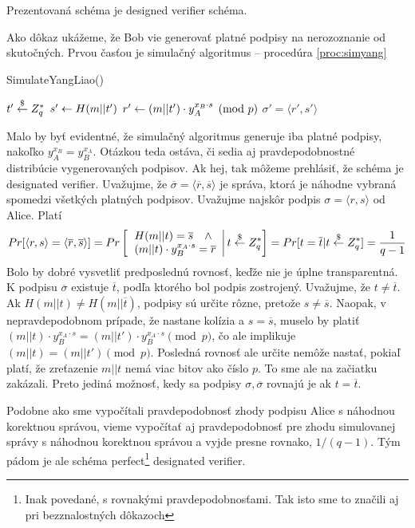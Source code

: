 \begin{lema}
    Prezentovaná schéma je designed verifier schéma.
\end{lema}
\begin{dokaz}
    Ako dôkaz ukážeme, že Bob vie generovať platné podpisy na
    nerozoznanie od skutočných. Prvou časťou je simulačný algoritmus
    -- procedúra \ref{proc:simyang}
    \begin{procedure}
        \caption{SimulateYangLiao()}
        \label{proc:simyang}
        $t' \overset{\$}{\leftarrow} Z_q^*$\;
        $s' \leftarrow H(m||t')$\;
        $r' \leftarrow (m||t') \cdot y_A^{x_B \cdot s} \pmod{p}$\; 
        \Return $\sigma'=\langle r',s' \rangle$\;
    \end{procedure}

    Malo by byť evidentné, že simulačný algoritmus generuje iba platné
    podpisy, nakoľko $y_A^{x_B} = y_B^{x_A}$.
    Otázkou teda ostáva, či sedia aj pravdepodobnostné
    distribúcie vygenerovaných podpisov. Ak hej, tak môžeme prehlásiť,
    že schéma je designated verifier.
    Uvažujme, že
    $\overline{\sigma}=\langle \overline{r}, \overline{s} \rangle$ 
    je správa, ktorá je
    náhodne vybraná spomedzi všetkých platných podpisov.
    Uvažujme najskôr podpis $\sigma = \langle r,s \rangle$ od Alice.
    Platí
    \begin{equation*}
        Pr[\langle r,s \rangle = 
            \langle \overline{r}, \overline{s} \rangle] =
        Pr\left[ \left.
            \begin{array}{l}
            H(m||t) = \overline{s} \quad \land \\ 
            (m||t) \cdot y_B^{x_A \cdot s} = \overline{r}
            \end{array} \right| t \overset{\$}{\leftarrow} Z_q^*
        \right] = Pr[t = \overline{t} | t \overset{\$}{\leftarrow} Z_q^*] = \frac{1}{q-1}
    \end{equation*}
    Bolo by dobré vysvetliť predposlednú rovnosť, keďže nie je úplne
    transparentná. K podpisu $\overline{\sigma}$ existuje
    $\overline{t}$, podľa ktorého bol podpis zostrojený.
    Uvažujme, že $t \ne \overline{t}$. 
    Ak $H(m||t) \ne H(m||\overline{t})$, podpisy sú určite rôzne,
    pretože $s \ne \overline{s}$. Naopak, v nepravdepodobnom prípade,
    že nastane kolízia a $s = \overline{s}$, muselo by platiť
    $(m||t) \cdot y_B^{x_A \cdot s} = (m||t') \cdot y_B^{x_A \cdot s}
    \pmod{p}$, čo ale implikuje $(m||t) = (m||t') \pmod{p}$.
    Posledná rovnosť ale určite nemôže nastať, pokiaľ platí, 
    že zreťazenie $m||t$ nemá viac bitov ako číslo $p$.
    To sme ale na začiatku zakázali. Preto jediná možnosť,
    kedy sa podpisy $\sigma,\overline{\sigma}$ rovnajú je ak 
    $t=\overline{t}$.
     
    Podobne ako sme vypočítali pravdepodobnosť zhody podpisu Alice s
    náhodnou korektnou správou,
    vieme vypočítať aj pravdepodobnosť pre zhodu simulovanej
    správy s náhodnou korektnou správou a vyjde presne rovnako, $1/(q-1)$.
    Tým pádom je ale schéma perfect\footnote{Inak povedané,
        s rovnakými pravdepodobnosťami. Tak isto sme to značili aj pri
        bezznalostných dôkazoch} designated verifier.
\end{dokaz}

